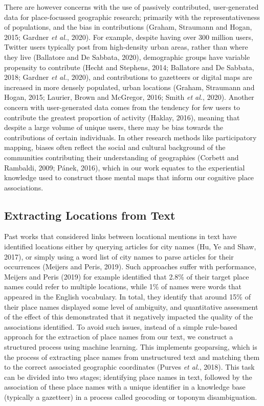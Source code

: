 \documentclass[
  letterpaper,
  11pt,
  english,
  onehalfspacing,
  headsepline]{MastersDoctoralThesis}
\begin{document}
There are however concerns with the use of passively contributed,
user-generated data for place-focussed geographic research; primarily
with the representativeness of populations, and the bias in
contributions (Graham, Straumann and Hogan, 2015; Gardner \emph{et al.},
2020). For example, despite having over 300 million users, Twitter users
typically post from high-density urban areas, rather than where they
live (Ballatore and De Sabbata, 2020), demographic groups have variable
propensity to contribute (Hecht and Stephens, 2014; Ballatore and De
Sabbata, 2018; Gardner \emph{et al.}, 2020), and contributions to
gazetteers or digital maps are increased in more densely populated,
urban locations (Graham, Straumann and Hogan, 2015; Laurier, Brown and
McGregor, 2016; Smith \emph{et al.}, 2020). Another concern with
user-generated data comes from the tendency for few users to contribute
the greatest proportion of activity (Haklay, 2016), meaning that despite
a large volume of unique users, there may be bias towards the
contributions of certain individuals. In other research methods like
participatory mapping, biases often reflect the social and cultural
background of the communities contributing their understanding of
geographies (Corbett and Rambaldi, 2009; Pánek, 2016), which in our work
equates to the experiential knowledge used to construct those mental
maps that inform our cognitive place associations.

\hypertarget{extracting-locations-from-text}{%
\subsection{Extracting Locations from
Text}\label{extracting-locations-from-text}}

Past works that considered links between locational mentions in text
have identified locations either by querying articles for city names
(Hu, Ye and Shaw, 2017), or simply using a word list of city names to
parse articles for their occurrences (Meijers and Peris, 2019). Such
approaches suffer with performance, Meijers and Peris (2019) for example
identified that 2.8\% of their target place names could refer to
multiple locations, while 1\% of names were words that appeared in the
English vocabulary. In total, they identify that around 15\% of their
place names displayed some level of ambiguity, and quantitative
assessment of the effect of this demonstrated that it negatively
impacted the quality of the associations identified. To avoid such
issues, instead of a simple rule-based approach for the extraction of
place names from our text, we construct a structured process using
machine learning. This implements geoparsing, which is the process of
extracting place names from unstructured text and matching them to the
correct associated geographic coordinates (Purves \emph{et al.}, 2018).
This task can be divided into two stages; identifying place names in
text, followed by the association of these place names with a unique
identifier in a knowledge base (typically a gazetteer) in a process
called geocoding or toponym disambiguation.
\end{document}
